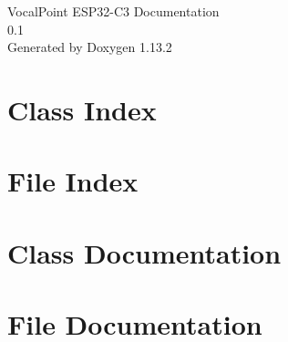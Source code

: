 \documentclass[twoside]{book}
\newcommand{\+}{\discretionary{\mbox{\scriptsize$\hookleftarrow$}}{}{}}
\newcommand{\clearemptydoublepage}{%
    \newpage{\pagestyle{empty}\cleardoublepage}%
  }
\begin{document}
  \raggedbottom
    \hypersetup{pageanchor=false,
                bookmarksnumbered=true,
                pdfencoding=unicode
               }
  \begin{titlepage}
  \vspace*{7cm}
  \begin{center}%
  {\Large Vocal\+Point ESP32-\/\+C3 Documentation}\\
  [1ex]\large 0.\+1 \\
  \vspace*{1cm}
  {\large Generated by Doxygen 1.13.2}\\
  \end{center}
  \end{titlepage}
  \clearemptydoublepage
  \tableofcontents
  \clearemptydoublepage
  \hypersetup{pageanchor=true}

\chapter{Class Index}

\chapter{File Index}

\chapter{Class Documentation}



\chapter{File Documentation}


















  \backmatter
  \newpage
  \clearemptydoublepage
  \printindex
\end{document}
